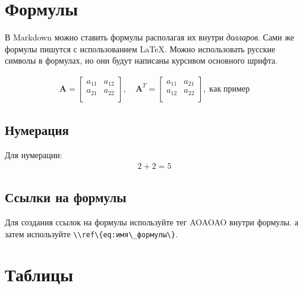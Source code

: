 \documentclass[a4paper]{article}
\renewcommand{\emph}[1]{\textit{#1}}
\newcommand{\passthrough}[1]{{\codefont #1}}
\begin{document}
\section{Формулы}\label{ux444ux43eux440ux43cux443ux43bux44b}

В Markdown можно ставить формулы располагая их внутри \emph{долларов}.
Сами же формулы пишутся с использованием \LaTeX. Можно использовать
русские символы в формулах, но они будут написаны курсивом основного
шрифта.

\begin{equation}\begin{gathered}

\mathbf{A} = 
\begin{bmatrix}
a_{11} & a_{12} \\
a_{21} & a_{22} \\
\end{bmatrix}, \quad
\mathbf{A}^T = 
\begin{bmatrix}
a_{11} & a_{21} \\
a_{12} & a_{22} \\
\end{bmatrix}
,\;\mathit{как}\;\mathit{пример}

\label{eq:Пример}
\end{gathered}\end{equation}

\subsection{Нумерация}\label{ux43dux443ux43cux435ux440ux430ux446ux438ux44f}

Для нумерации: \begin{equation}
\begin{gathered}2+2=5\end{gathered}
\end{equation}

\subsection{Ссылки на
формулы}\label{ux441ux441ux44bux43bux43aux438-ux43dux430-ux444ux43eux440ux43cux443ux43bux44b}

Для создания ссылок на формулы используйте тег AOAOAO внутри формулы. а
затем используйте \passthrough{\lstinline!\\ref\{eq:имя\_формулы\}!}.

\section{Таблицы}\label{ux442ux430ux431ux43bux438ux446ux44b}
\end{document}
